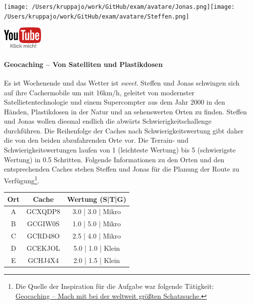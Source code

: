 \documentclass[a4paper, 9pt]{scrartcl}\usepackage[]{graphicx}\usepackage[]{xcolor}
\begin{document}
 
\ifcollection
\begin{flushright}
\tiny\vspace{-3Ex}
\textbf{\examinhaltstart}
\exammodulemathstat
\vspace{-4Ex}
\end{flushright}
\begin{minipage}[t]{0.5\textwidth}
\texttt{[image: /Users/kruppajo/work/GitHub/exam/avatare/Jonas.png]}\hspace{-4mm}\texttt{[image: /Users/kruppajo/work/GitHub/exam/avatare/Steffen.png]}
\end{minipage}
\begin{minipage}[t]{0.5\textwidth}
\hfill
\href{https://youtu.be/3LAq3R0rS14}{\includegraphics[width = 2cm]{img/youtube}}
\end{minipage}
\fi



\ifcollection
\paragraph{Geocaching -- Von Satelliten und Plastikdosen}
\fi



Es ist Wochenende und das Wetter ist \textit{sweet}. Steffen und Jonas schwingen sich auf ihre Cachermobile um mit 16km/h, geleitet von modernster Satellietentechnologie und einem Supercompter aus dem Jahr 2000 in den Händen, Plastikdosen in der Natur und an sehenswerten Orten zu finden. Steffen und Jonas wollen diesmal endlich die abwärts Schwierigkeitschallenge durchführen. Die Reihenfolge der Caches nach Schwierigkeitswertung gibt daher die von den beiden abzufahrenden Orte vor. Die Terrain- und Schwierigkeitswertungen laufen von 1 (leichteste Wertung) bis 5 (schwierigste Wertung) in 0.5 Schritten. Folgende Informationen zu den Orten und den entsprechenden Caches stehen Steffen und Jonas für die Planung der Route zu Verfügung\footnote{Die Quelle der Inspiration für die Aufgabe war folgende Tätigkeit: \href{https://www.geocaching.com/play}{Geocaching -- Mach mit bei der weltweit größten Schatzsuche.}}.

\begin{center}
  \begin{tabular}{ ccc }
    \toprule
    Ort & Cache & Wertung (S|T|G) \\
    \midrule
    A & GCXQDP8 & 3.0 | 3.0 | Mikro \\
    B & GCGIW0S & 1.0 | 5.0 | Mikro \\ 
    C & GCRD48O & 2.5 | 4.0 | Mikro \\ 
    D & GCEKJOL & 5.0 | 1.0 | Klein \\ 
    E & GCHJ4X4 & 2.0 | 1.5 | Klein \\     
 \bottomrule
\end{tabular}
\end{center}
\end{document}
